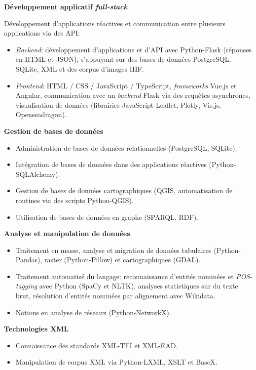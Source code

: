 \datedsubsection{ }
{}
{%
	\textbf{Développement applicatif \textit{full-stack}}}
{%
	Développement d'applications réactives et communication entre plusieurs applications via des API: 
	\begin{itemize}
		\item \textit{Backend}: développement d'applications et d'API avec Python-Flask (réponses en HTML et JSON), s'appuyant sur des bases de données PostgreSQL, SQLite, XML et des corpus d'images IIIF.
		\item \textit{Frontend}: HTML / CSS / JavaScript / TypeScript, \textit{frameworks} Vue.js et Angular, communication avec un \textit{backend} Flask via des requêtes asynchrones, visualisation de données (librairies JavaScript Leaflet, Plotly, Vis.js, Openseadragon).
	\end{itemize}
}

\datedsubsection{ }
{}
{%
	\textbf{Gestion de bases de données}}
{%
	\begin{itemize}
		\item Administration de bases de données relationnelles (PostgreSQL, SQLite).
		\item Intégration de bases de données dans des applications réactives (Python-SQLAlchemy).
		\item Gestion de bases de données cartographiques (QGIS, automatisation de routines via des scripts Python-QGIS).
		\item Utilisation de bases de données en graphe (SPARQL, RDF).
	\end{itemize}
}

\datedsubsection{ }
{}
{%
	\textbf{Analyse et manipulation de données}}
{%
	\begin{itemize}
		\item Traitement en masse, analyse et migration de données tabulaires (Python-Pandas), raster (Python-Pillow) et cartographiques (GDAL).
		\item Traitement automatisé du langage: reconnaissance d'entités nommées et \textit{POS-tagging} avec Python (SpaCy et NLTK), analyses statistiques sur du texte brut, résolution d'entités nommées par alignement avec Wikidata.
		\item Notions en analyse de réseaux (Python-NetworkX).
	\end{itemize}
}

\datedsubsection{ }
{}
{%
	\textbf{Technologies XML}}
{%
	\begin{itemize}
		\item Connaissance des standards XML-TEI et XML-EAD.
		\item Manipulation de corpus XML via Python-LXML, XSLT et BaseX.
	\end{itemize}
}

